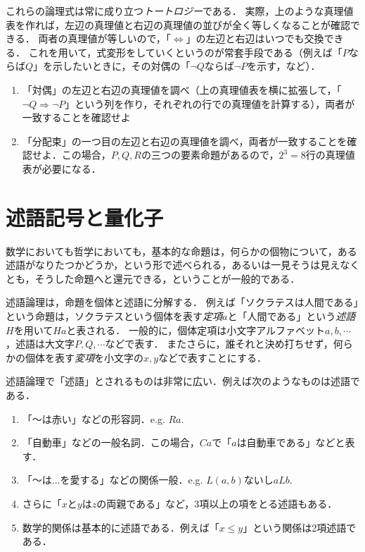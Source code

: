 \documentclass[11pt,a4paper]{jsarticle}
\begin{document}
これらの論理式は常に成り立つ\emph{トートロジー}である．
実際，上のような真理値表を作れば，左辺の真理値と右辺の真理値の並びが全く等しくなることが確認できる．
両者の真理値が等しいので，「$\iff$」の左辺と右辺はいつでも交換できる．
これを用いて，式変形をしていくというのが常套手段である（例えば「$P$ならば$Q$」を示したいときに，その対偶の「$\neg Q$ならば$\neg P$を示す，など）．


\begin{exercise} 
 \begin{enumerate}
     \item 「対偶」の左辺と右辺の真理値を調べ（上の真理値表を横に拡張して，「$\neg Q \Rightarrow \neg P$」という列を作り，それぞれの行での真理値を計算する），両者が一致することを確認せよ
     \item 「分配束」の一つ目の左辺と右辺の真理値を調べ，両者が一致することを確認せよ．この場合，$P, Q, R$の三つの要素命題があるので，$2^3=8$行の真理値表が必要になる．
 \end{enumerate}
\end{exercise}

\section{述語記号と量化子}
数学においても哲学においても，基本的な命題は，何らかの個物について，ある述語がなりたつかどうか，という形で述べられる，あるいは一見そうは見えなくとも，そうした命題へと還元できる，ということが一般的である．

述語論理は，命題を個体と述語に分解する．
例えば「ソクラテスは人間である」という命題は，ソクラテスという個体を表す\emph{定項}$a$と「人間である」という\emph{述語}$H$を用いて$Ha$と表される．
一般的に，個体定項は小文字アルファベット$a, b, \cdots$，述語は大文字$P, Q, \cdots$などで表す．
またさらに，誰それと決め打ちせず，何らかの個体を表す\emph{変項}を小文字の$x, y$などで表すことにする． 

述語論理で「述語」とされるものは非常に広い．例えば次のようなものは述語である．
\begin{enumerate}
    \item 「〜は赤い」などの形容詞．e.g. $Ra$.
    \item 「自動車」などの一般名詞．この場合，$Ca$で「$a$は自動車である」などと表す．
    \item 「〜は...を愛する」などの関係一般．e.g. $L(a,b)$ないし$aLb$. 
    \item さらに「$x$と$y$は$z$の両親である」など，3項以上の項をとる述語もある．
    \item 数学的関係は基本的に述語である．例えば「$x \leq y$」という関係は2項述語である．
\end{enumerate}
\end{document}
